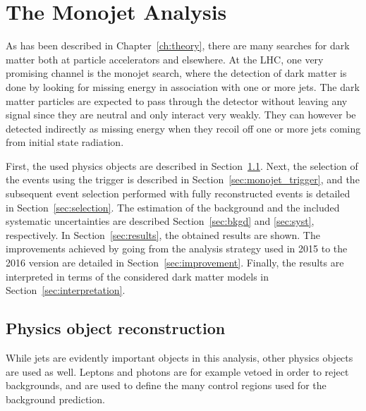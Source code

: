 \graphicspath{{chapt_dutch/}{intro/}{monojet/}}

\renewcommand\evenpagerightmark{{\scshape\small Chapter 5}}
\renewcommand\oddpageleftmark{{\scshape\small The Monojet Analysis}}

\hyphenation{}

\chapter{The Monojet Analysis}
\label{ch:monojet}

As has been described in Chapter~\ref{ch:theory}, there are many searches for dark matter both at 
particle accelerators and elsewhere. At the \ac{LHC}, one very promising channel is the 
monojet search, where the detection of dark matter is done by looking for missing energy in association 
with one or more jets. The dark matter particles are expected to pass through the detector without leaving any signal since they are neutral and only interact very weakly. They can however be detected indirectly as missing energy when they recoil off one or more jets coming from initial state radiation.

First, the used physics objects are described in Section~\ref{sec:monojet_objects}. Next, the selection of the events using the trigger is described in Section~\ref{sec:monojet_trigger}, and the subsequent event selection performed with fully reconstructed events is detailed in Section~\ref{sec:selection}. The estimation of the background and the included systematic uncertainties are described Section~\ref{sec:bkgd} and \ref{sec:syst}, respectively. In Section~\ref{sec:results}, the obtained results are shown. The improvements achieved by going from the analysis strategy used in 2015 to the 2016 version are detailed in Section~\ref{sec:improvement}. Finally, the results are interpreted in terms of the considered dark matter models in Section~\ref{sec:interpretation}.


\section{Physics object reconstruction}
\label{sec:monojet_objects}

While jets are evidently important objects in this analysis, other physics objects are used as well. Leptons and photons are for example vetoed in order to reject backgrounds, and are used to define the many control regions used for the background prediction. 

